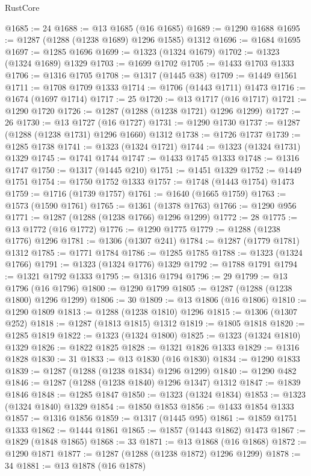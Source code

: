 \begin{lexlean}{RustCore}
\begin{coremodule}
@1685 := 24
@1688 := @13 @1685 (@16 @1685)
@1689 := @1290 @1688
@1695 := @1287 (@1288 (@1238 @1689) @1296 @1585) @1312
@1696 := @1684 @1695
@1697 := @1285 @1696
@1699 := @1323 (@1324 @1679)
@1702 := @1323 (@1324 @1689) @1329
@1703 := @1699 @1702
@1705 := @1433 @1703 @1333
@1706 := @1316 @1705
@1708 := @1317 (@1445 @38)
@1709 := @1449 @1561
@1711 := @1708 @1709 @1333
@1714 := @1706 (@1443 @1711) @1473
@1716 := @1674 (@1697 @1714)
@1717 := 25
@1720 := @13 @1717 (@16 @1717)
@1721 := @1290 @1720
@1726 := @1287 (@1288 (@1238 @1721) @1296 @1299)
@1727 := 26
@1730 := @13 @1727 (@16 @1727)
@1731 := @1290 @1730
@1737 := @1287 (@1288 (@1238 @1731) @1296 @1660) @1312
@1738 := @1726 @1737
@1739 := @1285 @1738
@1741 := @1323 (@1324 @1721)
@1744 := @1323 (@1324 @1731) @1329
@1745 := @1741 @1744
@1747 := @1433 @1745 @1333
@1748 := @1316 @1747
@1750 := @1317 (@1445 @210)
@1751 := @1451 @1329
@1752 := @1449 @1751
@1754 := @1750 @1752 @1333
@1757 := @1748 (@1443 @1754) @1473
@1759 := @1716 (@1739 @1757)
@1761 := @1640 (@1665 @1759)
@1763 := @1573 (@1590 @1761)
@1765 := @1361 (@1378 @1763)
@1766 := @1290 @956
@1771 := @1287 (@1288 (@1238 @1766) @1296 @1299)
@1772 := 28
@1775 := @13 @1772 (@16 @1772)
@1776 := @1290 @1775
@1779 := @1288 (@1238 @1776) @1296
@1781 := @1306 (@1307 @241)
@1784 := @1287 (@1779 @1781) @1312
@1785 := @1771 @1784
@1786 := @1285 @1785
@1788 := @1323 (@1324 @1766)
@1791 := @1323 (@1324 @1776) @1329
@1792 := @1788 @1791
@1794 := @1321 @1792 @1333
@1795 := @1316 @1794
@1796 := 29
@1799 := @13 @1796 (@16 @1796)
@1800 := @1290 @1799
@1805 := @1287 (@1288 (@1238 @1800) @1296 @1299)
@1806 := 30
@1809 := @13 @1806 (@16 @1806)
@1810 := @1290 @1809
@1813 := @1288 (@1238 @1810) @1296
@1815 := @1306 (@1307 @252)
@1818 := @1287 (@1813 @1815) @1312
@1819 := @1805 @1818
@1820 := @1285 @1819
@1822 := @1323 (@1324 @1800)
@1825 := @1323 (@1324 @1810) @1329
@1826 := @1822 @1825
@1828 := @1321 @1826 @1333
@1829 := @1316 @1828
@1830 := 31
@1833 := @13 @1830 (@16 @1830)
@1834 := @1290 @1833
@1839 := @1287 (@1288 (@1238 @1834) @1296 @1299)
@1840 := @1290 @482
@1846 := @1287 (@1288 (@1238 @1840) @1296 @1347) @1312
@1847 := @1839 @1846
@1848 := @1285 @1847
@1850 := @1323 (@1324 @1834)
@1853 := @1323 (@1324 @1840) @1329
@1854 := @1850 @1853
@1856 := @1433 @1854 @1333
@1857 := @1316 @1856
@1859 := @1317 (@1445 @95)
@1861 := @1859 @1751 @1333
@1862 := @1444 @1861
@1865 := @1857 (@1443 @1862) @1473
@1867 := @1829 (@1848 @1865)
@1868 := 33
@1871 := @13 @1868 (@16 @1868)
@1872 := @1290 @1871
@1877 := @1287 (@1288 (@1238 @1872) @1296 @1299)
@1878 := 34
@1881 := @13 @1878 (@16 @1878)

\end{coremodule}
\end{lexlean}
